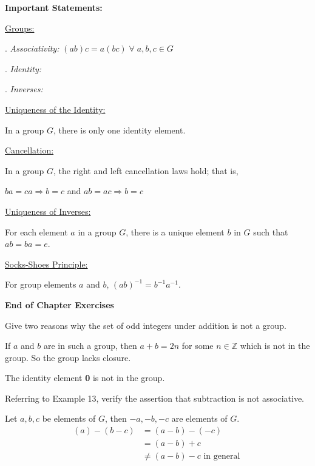 \documentclass[11pt,largemargins]{homework}
\begin{document}
\maketitle

\textbf{\large{Important Statements:}}

\underline{Groups:}

. \textit{Associativity:} $(ab)c=a(bc) \;\forall\;a,b,c \in G$

. \textit{Identity:} 

. \textit{Inverses:}

\underline{Uniqueness of the Identity:}

\quad In a group $G$, there is only one identity element.

\underline{Cancellation:}

\quad In a group $G$, the right and left cancellation laws hold; that is, 

\quad $ba=ca \Rightarrow b=c$ and $ab=ac \Rightarrow b=c$

\underline{Uniqueness of Inverses:}

\quad For each element $a$ in a group $G$, there is a unique element $b$ in $G$ such that $ab=ba=e$.

\underline{Socks-Shoes Principle:}

\quad For group elements $a$ and $b$, $(ab)^{-1}=b^{-1}a^{-1}$.

\hfill

\textbf{\large{End of Chapter Exercises}}

\question
Give two reasons why the set of odd integers under addition is not a group.

\begin{arabicparts}
    \questionpart
    If $a$ and $b$ are in such a group, then $a+b=2n$ for some $n\in\mathbb{Z}$ which is not in the group. So the group lacks
    closure.

    \questionpart
    The identity element \textbf{0} is not in the group.
\end{arabicparts}
    
\question
Referring to Example 13, verify the assertion that subtraction is not associative.

\quad Let $a,b,c$ be elements of $G$, then $-a, -b, -c$ are elements of $G$. 
\begin{align*}
    (a)-(b-c) &= (a-b)-(-c)\\
              &= (a-b)+c\\
              &\neq (a-b)-c \text{ in general }
\end{align*}
\end{document}
